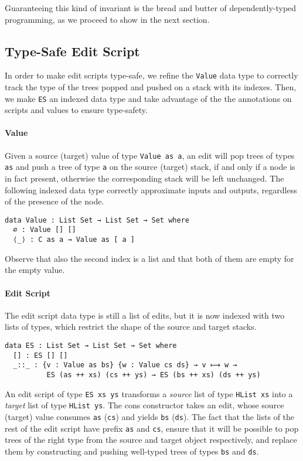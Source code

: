 \documentclass{sigplanconf}
\theoremstyle{plain}
\begin{document}
%
Guaranteeing this kind of invariant is the bread and butter of
dependently-typed programming, as we proceed to show in the next
section.

\subsection{Type-Safe Edit Script}
In order to make edit scripts type-safe, we refine the \texttt{Value}
data type to correctly track the type of the trees popped and pushed
on a stack with its indexes.
%
Then, we make \texttt{ES} an indexed data type and take advantage of
the the annotations on scripts and values to ensure type-safety.

\paragraph{Value}
Given a source (target) value of type \texttt{Value as a}, an edit
will pop trees of types \texttt{as} and push a tree of type \texttt{a}
on the source (target) stack, if and only if a node is in fact
present, otherwise the corresponding stack will be left unchanged.
%
The following indexed data type correctly approximate inputs and
outputs, regardless of the presence of the node.
\begin{verbatim}
data Value : List Set → List Set → Set where
  ∅ : Value [] []
  ⟨_⟩ : C as a → Value as [ a ] 
\end{verbatim}
Observe that also the second index is a list and that both of them are
empty for the empty value.
%

\paragraph{Edit Script}
The edit script data type is still a list of edits, but it is now
indexed with two lists of types, which restrict the shape of the
source and target stacks.
%
\begin{verbatim}
data ES : List Set → List Set → Set where
  [] : ES [] []
  _::_ : {v : Value as bs} {w : Value cs ds} → v ⟼ w → 
          ES (as ++ xs) (cs ++ ys) → ES (bs ++ xs) (ds ++ ys)
\end{verbatim}	
An edit script of type \texttt{ES xs ys} transforms a \emph{source}
list of type \texttt{HList xs} into a \emph{target} list of type
\texttt{HList ys}.  
%
The cons constructor takes an edit, whose source (target) value
consumes \texttt{as} (\texttt{cs}) and yields \texttt{bs}
(\texttt{ds}).
%
The fact that the lists of the rest of the edit script have prefix
\texttt{as} and \texttt{cs}, ensure that it will be possible to pop
trees of the right type from the source and target object
respectively, and replace them by constructing and pushing well-typed
trees of types \texttt{bs} and \texttt{ds}.
\end{document}
